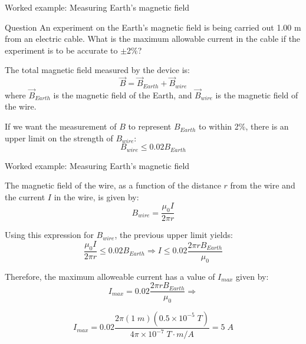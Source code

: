 {
\problemslide

\begin{frame}{Worked example: Measuring Earth's magnetic field}

  \begin{blockexmplque}{Question}
    An experiment on the Earth’s magnetic field is being carried out 1.00 m
    from an electric cable. What is the maximum allowable current in the
    cable if the experiment is to be accurate to $\pm$2\%?
  \end{blockexmplque}

  The total magnetic field measured by the device is:
  \begin{equation*}
    \vec{B} = \vec{B}_{Earth} + \vec{B}_{wire}
  \end{equation*}
  where $\vec{B}_{Earth}$ is the magnetic field of the Earth, and
  $\vec{B}_{wire}$ is the magnetic field of the wire.\\
  \vspace{0.2cm}

  If we want the measurement of $B$ to represent $B_{Earth}$ to within 2\%,
  there is an upper limit on the strength of $B_{wire}$:
  \begin{equation*}
    B_{wire} \le 0.02 B_{Earth}
  \end{equation*}

\end{frame}

%
%
%

\begin{frame}{Worked example: Measuring Earth's magnetic field}

  The magnetic field of the wire, as a function of the distance $r$
  from the wire and the current $I$ in the wire, is given by:
  \begin{equation*}
    B_{wire} = \frac{\mu_0 I}{2\pi r}
  \end{equation*}

  Using this expression for $B_{wire}$, the previous upper limit yields:
  \begin{equation*}
    \frac{\mu_0 I}{2\pi r} \le 0.02 B_{Earth} \Rightarrow
    I \le 0.02 \frac{2\pi r B_{Earth}}{\mu_0}
  \end{equation*}

  Therefore, the maximum alloweable current has a value of $I_{max}$
  given by:
  \begin{equation*}
    I_{max} = 0.02 \frac{2\pi r B_{Earth}}{\mu_0} \Rightarrow
  \end{equation*}

  \begin{equation*}
    I_{max} = 0.02 \frac{2\pi (1\; m) (0.5\times 10^{-5}\; T)}
                        {4\pi \times 10^{-7} \; T\cdot m/A}
            = 5 \; A
  \end{equation*}

\end{frame}

} %

